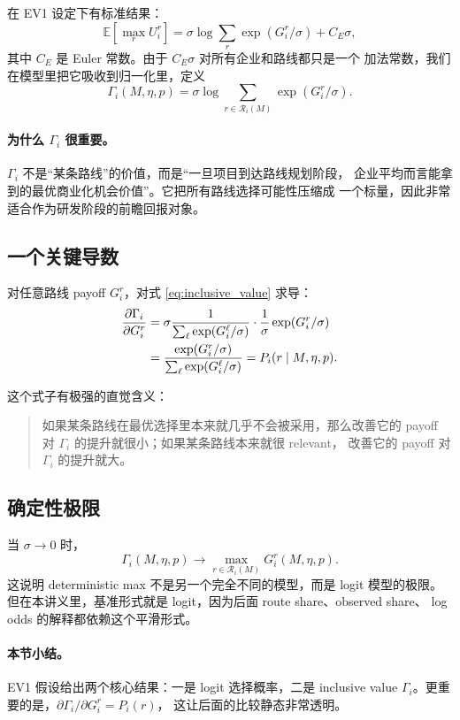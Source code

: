 \documentclass[12pt,UTF8]{ctexart}
\newcommand{\E}{\mathbb{E}}
\newcommand{\Rset}{\mathcal{R}}
\theoremstyle{plain}
\theoremstyle{remark}
\begin{document}
在 EV1 设定下有标准结果：
\[
\E\left[\max_{r}U_i^r\right]
=
\sigma\log\sum_{r}\exp(G_i^r/\sigma)+C_E\sigma,
\]
其中 $C_E$ 是 Euler 常数。由于 $C_E\sigma$ 对所有企业和路线都只是一个
加法常数，我们在模型里把它吸收到归一化里，定义
\begin{equation}
\Gamma_i(M,\eta,p)
=
\sigma\log\sum_{r\in\Rset_i(M)}\exp(G_i^r/\sigma).
\label{eq:inclusive_value}
\end{equation}

\paragraph{为什么 $\Gamma_i$ 很重要。}
$\Gamma_i$ 不是“某条路线”的价值，而是“一旦项目到达路线规划阶段，
企业平均而言能拿到的最优商业化机会价值”。它把所有路线选择可能性压缩成
一个标量，因此非常适合作为研发阶段的前瞻回报对象。

\subsection{一个关键导数}

对任意路线 payoff $G_i^r$，对式 \eqref{eq:inclusive_value} 求导：
\begin{align}
\frac{\partial \Gamma_i}{\partial G_i^r}
&=
\sigma
\frac{1}{\sum_{\ell}\exp(G_i^\ell/\sigma)}
\cdot
\frac{1}{\sigma}\exp(G_i^r/\sigma)\notag\\
&=
\frac{\exp(G_i^r/\sigma)}
{\sum_{\ell}\exp(G_i^\ell/\sigma)}
=
P_i(r\mid M,\eta,p).
\label{eq:Gamma_derivative}
\end{align}

这个式子有极强的直觉含义：

\begin{quote}
如果某条路线在最优选择里本来就几乎不会被采用，那么改善它的 payoff
对 $\Gamma_i$ 的提升就很小；如果某条路线本来就很 relevant，
改善它的 payoff 对 $\Gamma_i$ 的提升就大。
\end{quote}

\subsection{确定性极限}

当 $\sigma\to 0$ 时，
\[
\Gamma_i(M,\eta,p)\to \max_{r\in\Rset_i(M)} G_i^r(M,\eta,p).
\]
这说明 deterministic max 不是另一个完全不同的模型，而是 logit 模型的极限。
但在本讲义里，基准形式就是 logit，因为后面 route share、observed share、
log odds 的解释都依赖这个平滑形式。

\paragraph{本节小结。}
EV1 假设给出两个核心结果：一是 logit 选择概率，二是 inclusive value
$\Gamma_i$。更重要的是，$\partial\Gamma_i/\partial G_i^r=P_i(r)$，
这让后面的比较静态非常透明。
\end{document}
